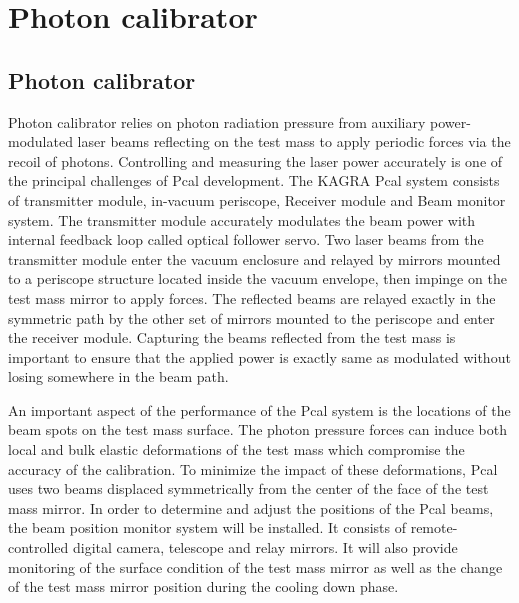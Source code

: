 
\chapter{Photon calibrator} %

\label{Chapter1} %





\section{Photon calibrator}
Photon calibrator relies on photon radiation pressure from auxiliary 
power-modulated laser beams reflecting on the test mass to apply periodic 
forces via the recoil of photons. Controlling and measuring the laser power 
accurately is one of the principal challenges of Pcal development. 
The KAGRA Pcal system consists of transmitter module, in-vacuum periscope, 
Receiver module and Beam monitor system. The transmitter module accurately 
modulates the beam power with internal feedback loop called optical follower 
servo. Two laser beams from the transmitter module enter the vacuum enclosure 
and relayed by mirrors mounted to a periscope structure located inside the 
vacuum envelope, then impinge on the test mass mirror to apply forces. 
The reflected beams are relayed exactly in the symmetric path by the 
other set of mirrors mounted to the periscope and enter the receiver module. 
Capturing the beams reflected from the test mass is important to ensure 
that the applied power is exactly same as modulated without losing 
somewhere in the beam path.

An important aspect of the performance of the Pcal system is the locations 
of the beam spots on the test mass surface. The photon pressure forces can 
induce both local and bulk elastic deformations of the test mass which 
compromise the accuracy of the calibration. To minimize the impact of these 
deformations, Pcal uses two beams displaced symmetrically from the center 
of the face of the test mass mirror. In order to determine and adjust the 
positions of the Pcal beams, the beam position monitor system will be 
installed. It consists of remote-controlled digital camera, telescope and 
relay mirrors. It will also provide monitoring of the surface condition of 
the test mass mirror as well as the change of the test mass mirror position 
during the cooling down phase.

